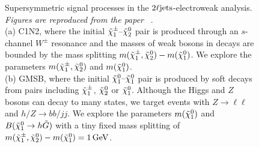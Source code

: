 \begin{figure}[tp]
\caption[
Supersymmetric signal processes in the $\twoljets$-electroweak analysis
]{%
Supersymmetric signal processes in the $\twoljets$-electroweak analysis.
\emph{Figures are reproduced from the paper%
}~\cite{atlas2022searches, atlas_susy_feynman}.
\\[0.5em]
(a) C1N2, where the initial $\chargino_1\textrm{--}\neutralino_2$ pair
is produced through an $s$-channel $W^{\pm}$ resonance and the masses of
weak bosons in decays are bounded by the mass splitting
$m(\chargino_1, \neutralino_2) - m(\neutralino_1)$.
We explore the parameters
$m(\chargino_1, \neutralino_2)$ and $m(\neutralino_1)$.
\\[0.5em]
(b) GMSB, where the initial $\neutralino_1\textrm{--}\neutralino_1$ pair
is produced by soft decays from pairs including $\chargino_1$,
$\neutralino_2$ or $\neutralino_1$.
Although the Higgs and $Z$ bosons can decay to many states, we target events
with $Z\to \ell\ell$ and $h/Z\to bb/jj$.
We explore the parameters
$m(\neutralino_1)$ and $B(\neutralino_1 \to h \tilde{G})$ with a tiny
fixed mass splitting of
$m(\chargino_1, \neutralino_2) - m(\neutralino_1) = 1\,\eV[G]$.%
}
\label{fig:2ljets_signal_diagrams}
\end{figure}

